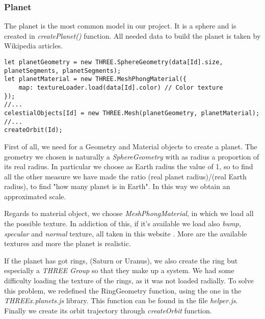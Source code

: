 \documentclass{article}
\begin{document}
\subsubsection{Planet} 
The planet is the most common model in our project. It is a sphere and is created in \textit{createPlanet()} function. All needed data to build the planet is taken by Wikipedia articles\cite{wikipedia}.
\begin{lstlisting}
let planetGeometry = new THREE.SphereGeometry(data[Id].size, planetSegments, planetSegments);
let planetMaterial = new THREE.MeshPhongMaterial({
	map: textureLoader.load(data[Id].color) // Color texture
});
//...
celestialObjects[Id] = new THREE.Mesh(planetGeometry, planetMaterial);
//...
createOrbit(Id);
\end{lstlisting}
First of all, we need for a Geometry and Material objects to create a planet. The geometry we chosen is naturally a \textit{SphereGeometry}\cite{documentation:threejs} with as radius a proportion of its real radius. In particular we choose as Earth radius the value of 1, so to find all the other measure we have made the ratio (real planet radius)/(real Earth radius), to find "how many planet is in Earth". In this way we obtain an approximated scale.
\par Regards to material object, we choose \textit{MeshPhongMaterial}\cite{documentation:threejs}, in which we load all the possible texture. In addiction of this, if it's available we load also \textit{bump, specular} and \textit{normal} texture, all taken in this website \cite{planetpixelemporium}. More are the available textures and more the planet is realistic.
\par If the planet has got rings, (Saturn or Uranus), we also create the ring but especially a \textit{THREE Group} so that they make up a system.
We had some difficulty loading the texture of the rings, as it was not loaded radially. To solve this problem, we redefined the RingGeometry function, using the one in the \textit{THREEx.planets.js}\cite{earthcloudsradiustexture} library. This function can be found in the file \textit{helper.js}.
Finally we create its orbit trajectory through \textit{createOrbit} function.
\end{document}
